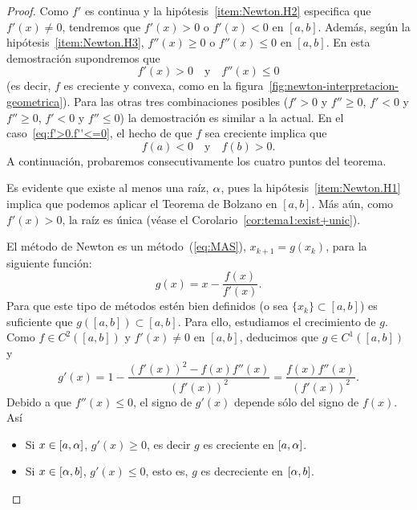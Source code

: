 \begin{proof}
  Como $f'$ es continua y la hipótesis~\ref{item:Newton.H2} especifica
  que $f'(x) \neq 0$, tendremos que $f'(x)>0$ o $f'(x)<0$ en $[a,b]$.
  Además, según la hipótesis~\ref{item:Newton.H3}, $f''(x)\ge 0$ o
  $f''(x)\le 0$ en $[a,b]$. En esta demostración supondremos que
  \begin{equation}
    f'(x)>0 \quad \text{y}\quad f''(x)\le 0
    \label{eq:f'>0.f''<=0}
  \end{equation}
  (es decir, $f$ es creciente y convexa, como en la
  figura~\ref{fig:newton-interpretacion-geometrica}). Para las otras
  tres combinaciones posibles ($f'>0$ y $f''\ge 0$, $f'<0$ y $f''\ge 0$,
  $f'<0$ y $f''\le 0$) la demostración es similar a la actual.
  En el caso~\eqref{eq:f'>0.f''<=0}, el hecho de que $f$ sea creciente implica que
  \begin{equation*}
    f(a)<0 \quad\text{y}\quad f(b)>0.
  \end{equation*}
  A continuación, probaremos consecutivamente los cuatro puntos del
  teorema.

  Es evidente que existe al menos una raíz, $\alpha$, pues la
  hipótesis~\ref{item:Newton.H1} implica que podemos aplicar el
  Teorema de Bolzano en $[a,b]$. Más aún, como $f'(x)>0$, la raíz es única (véase el
  Corolario~\ref{cor:tema1:exist+unic}).

  El método de Newton es un
  método~(\ref{eq:MAS}), $x_{k+1}=g(x_k)$, para la siguiente función:
  \begin{equation*}
    g(x)=x-\frac{f(x)}{f'(x)}.
  \end{equation*}
  Para que este tipo de métodos estén bien definidos (o sea
  $\{x_k\}\subset [a,b]$) es suficiente que $g([a,b])\subset [a,b]$.
  Para ello, estudiamos el crecimiento de $g$.
  Como $f\in C^2([a,b])$ y $f'(x)\neq 0$ en
  $[a,b]$, deducimos que $g\in C^1([a,b])$ y
  \begin{equation}
    g'(x)
    = 1-\frac{\left(f'(x)\right)^2-f(x)f''(x)}{\left(f'(x)\right)^2}
    = \frac{f(x)f''(x)}{\left(f'(x)\right)^2}.
    \label{eq:Newton.g'(x)}
  \end{equation}
  Debido a que $f''(x)\le 0$, el signo de $g'(x)$ depende sólo del
  signo de $f(x)$. Así
  \begin{itemize}%
  \item Si $x\in [a,\alpha]$, $g'(x)\ge 0$, es decir $g$ es creciente en
    $[a,\alpha]$.
  \item Si $x\in [\alpha,b]$, $g'(x)\le 0$, esto es, $g$ es decreciente
    en $[\alpha,b]$.
  \end{itemize}


\end{proof}
